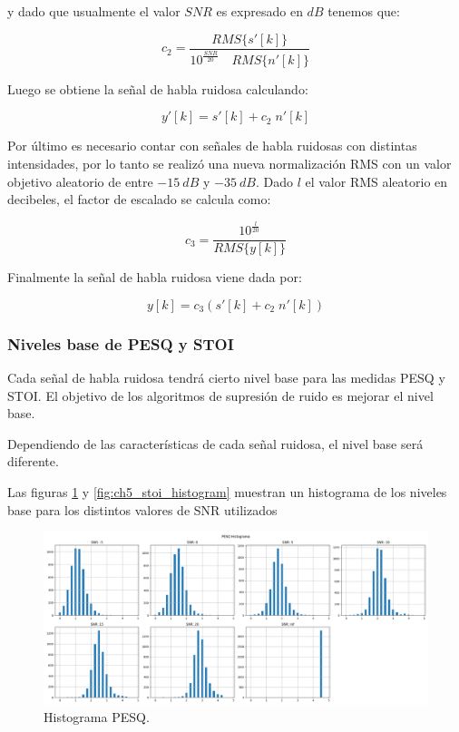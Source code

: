 y dado que usualmente el valor $SNR$ es expresado en $\si{dB}$ tenemos que:

\begin{equation*}
	c_2 = \frac{RMS\{s'[k]\}}{10^{\frac{SNR}{20}} \quad RMS\{n'[k]\}}
\end{equation*}

Luego se obtiene la señal de habla ruidosa calculando:

\begin{equation*}
	y'[k] = s'[k] + c_2 \; n'[k]
\end{equation*}

Por último es necesario contar con señales de habla ruidosas con distintas intensidades, por lo tanto se realizó una nueva normalización RMS con un valor objetivo aleatorio de entre $\SI{-15}{dB}$ y $\SI{-35}{dB}$. Dado $l$ el valor RMS aleatorio en decibeles, el factor de escalado se calcula como:

\begin{equation*}
	c_3 = \frac{10^{\frac{l}{20}}}{RMS\{y[k]\}}
\end{equation*}

Finalmente la señal de habla ruidosa viene dada por:

\begin{equation*}
	y[k] = c_3 \left( s'[k] + c_2 \; n'[k] \right)
\end{equation*}

\subsubsection{Niveles base de PESQ y STOI}

Cada señal de habla ruidosa tendrá cierto nivel base para las medidas PESQ y STOI. El objetivo de los algoritmos de supresión de ruido es mejorar el nivel base.

Dependiendo de las características de cada señal ruidosa, el nivel base será diferente.

Las figuras \ref{fig:ch5_pesq_histogram} y \ref{fig:ch5_stoi_histogram} muestran un histograma de los niveles base para los distintos valores de SNR utilizados

\begin{figure}[H]
	\centering
	\centerline{\includegraphics[scale=0.35]{images/ch5/pesq_aggregated.png}}
	\caption{Histograma PESQ.}
	\label{fig:ch5_pesq_histogram}
\end{figure}

